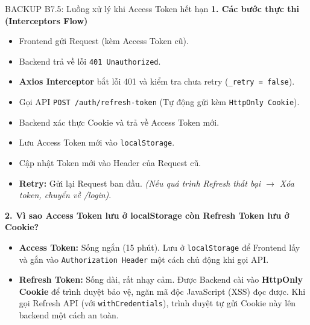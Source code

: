 \documentclass[10pt, aspectratio=169]{beamer}
\begin{document}
\begin{frame}[fragile, label=b7_5]{BACKUP B7.5: Luồng xử lý khi Access Token hết hạn}
\hypertarget{b7_5_target}{}
    \textbf{1. Các bước thực thi (Interceptors Flow)}
    \vspace{0.1cm}
    
    \begin{itemize}
        \small \setlength{\itemsep}{2pt}
        \item[\textbf{1.}] Frontend gửi Request (kèm Access Token cũ).
        \item[\textbf{2.}] Backend trả về lỗi \texttt{401 Unauthorized}.
        \item[\textbf{3.}] \textbf{Axios Interceptor} bắt lỗi 401 và kiểm tra chưa retry (\texttt{\_retry = false}).
        \item[\textbf{4.}] Gọi API \texttt{POST /auth/refresh-token} (Tự động gửi kèm \texttt{HttpOnly Cookie}).
        \item[\textbf{5.}] Backend xác thực Cookie và trả về Access Token mới.
        \item[\textbf{6.}] Lưu Access Token mới vào \texttt{localStorage}.
        \item[\textbf{7.}] Cập nhật Token mới vào Header của Request cũ.
        \item[\textbf{8.}] \textbf{Retry:} Gửi lại Request ban đầu. \textit{(Nếu quá trình Refresh thất bại $\rightarrow$ Xóa token, chuyển về /login)}.
    \end{itemize}

    \vspace{0.15cm}
    \textbf{2. Vì sao Access Token lưu ở localStorage còn Refresh Token lưu ở Cookie?}
    \vspace{0.1cm}
    
    \begin{itemize}
        \small \setlength{\itemsep}{2pt}
        \item \textbf{Access Token:} Sống ngắn (15 phút). Lưu ở \texttt{localStorage} để Frontend lấy và gắn vào \texttt{Authorization Header} một cách chủ động khi gọi API.
        \item \textbf{Refresh Token:} Sống dài, rất nhạy cảm. Được Backend cài vào \textbf{HttpOnly Cookie} để trình duyệt bảo vệ, ngăn mã độc JavaScript (XSS) đọc được. Khi gọi Refresh API (với \texttt{withCredentials}), trình duyệt tự gửi Cookie này lên backend một cách an toàn.
    \end{itemize}
\end{frame}
\end{document}
